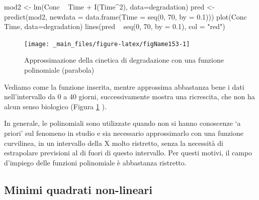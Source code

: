\documentclass[a4paper,12pt,oneside]{book}
\newenvironment{Shaded}{}{}
\newcommand{\KeywordTok}[1]{#1}
\newcommand{\DataTypeTok}[1]{#1}
\newcommand{\DecValTok}[1]{#1}
\newcommand{\FloatTok}[1]{#1}
\newcommand{\StringTok}[1]{#1}
\newcommand{\OperatorTok}[1]{#1}
\newcommand{\NormalTok}[1]{#1}
\begin{document}
\begin{Shaded}
\begin{Highlighting}[]
\NormalTok{mod2 <-}\StringTok{ }\KeywordTok{lm}\NormalTok{(Conc }\OperatorTok{~}\StringTok{ }\NormalTok{Time }\OperatorTok{+}\StringTok{ }\KeywordTok{I}\NormalTok{(Time}\OperatorTok{^}\DecValTok{2}\NormalTok{), }\DataTypeTok{data=}\NormalTok{degradation)}
\NormalTok{pred <-}\StringTok{ }\KeywordTok{predict}\NormalTok{(mod2, }\DataTypeTok{newdata =} \KeywordTok{data.frame}\NormalTok{(}\DataTypeTok{Time =} \KeywordTok{seq}\NormalTok{(}\DecValTok{0}\NormalTok{, }\DecValTok{70}\NormalTok{, }\DataTypeTok{by =} \FloatTok{0.1}\NormalTok{)))}
\KeywordTok{plot}\NormalTok{(Conc }\OperatorTok{~}\StringTok{ }\NormalTok{Time, }\DataTypeTok{data=}\NormalTok{degradation)}
\KeywordTok{lines}\NormalTok{(pred }\OperatorTok{~}\StringTok{ }\KeywordTok{seq}\NormalTok{(}\DecValTok{0}\NormalTok{, }\DecValTok{70}\NormalTok{, }\DataTypeTok{by =} \FloatTok{0.1}\NormalTok{), }\DataTypeTok{col =} \StringTok{"red"}\NormalTok{)}
\end{Highlighting}
\end{Shaded}

\begin{figure}

{\centering \texttt{[image: \_main\_files/figure-latex/figName153-1]} 

}

\caption{Approssimazione della cinetica di degradazione con una funzione polinomiale (parabola)}\label{fig:figName153}
\end{figure}

Vediamo come la funzione inserita, mentre approssima abbastanza bene i dati nell'intervallo da 0 a 40 giorni, successivamente mostra una ricrescita, che non ha alcun senso biologico (Figura \ref{fig:figName153} ).

In generale, le polinomiali sono utilizzate quando non si hanno conoscenze `a priori' sul fenomeno in studio e sia necessario approssimarlo con una funzione curvilinea, in un intervallo della X molto ristretto, senza la necessità di estrapolare previsioni al di fuori di questo intervallo. Per questi motivi, il campo d'impiego delle funzioni polinomiale è abbastanza ristretto.

\hypertarget{minimi-quadrati-non-lineari}{%
\subsection{Minimi quadrati non-lineari}\label{minimi-quadrati-non-lineari}}
\end{document}
